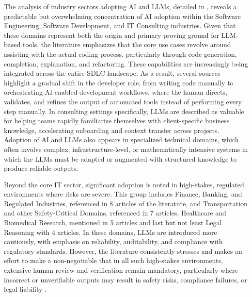 The analysis of industry sectors adopting AI and LLMs, detailed in , reveals a predictable but overwhelming concentration of AI adoption within the Software Engineering, Software Development, and IT Consulting industries. Given that these domains represent both the origin and primary proving ground for LLM-based tools, the literature emphasizes that the core use cases revolve around assisting with the actual coding process, particularly through code generation, completion, explanation, and refactoring. These capabilities are increasingly being integrated across the entire SDLC landscape. As a result, several sources highlight a gradual shift in the developer role, from writing code manually to orchestrating AI-enabled development workflows, where the human directs, validates, and refines the output of automated tools instead of performing every step manually. In consulting settings specifically, LLMs are described as valuable for helping teams rapidly familiarize themselves with client-specific business knowledge, accelerating onboarding and context transfer across projects. \cite{Jensen:2025me, Zhang:2025ea, Kim:2025ao} Adoption of AI and LLMs also appears in specialized technical domains, which often involve complex, infrastructure-level, or mathematically intensive systems in which the LLMs must be adapted or augmented with structured knowledge to produce reliable outputs. \cite{Wang:2025rs, Hou:2025cl, Ahmed:2025ai, Kim:2025ao, AlHashimi:2025er}

Beyond the core IT sector, significant adoption is noted in high-stakes, regulated environments where risks are severe. This group includes Finance, Banking, and Regulated Industries, referenced in 8 articles of the literature, and Transportation and other Safety-Critical Domains, referenced in 7 articles, Healthcare and Biomedical Research, mentioned in 5 articles and last but not least Legal Reasoning with 4 articles. In these domains, LLMs are introduced more cautiously, with emphasis on reliability, auditability, and compliance with regulatory standards.  However, the literature consistently stresses and makes an effort to make a non-negotiable that in all such high-stakes environments, extensive human review and verification remain mandatory, particularly where incorrect or unverifiable outputs may result in safety risks, compliance failures, or legal liability \cite{Moore:2025vc, Ahmed:2025ai, Jabrw:2025ss, Kim:2025ao, Qiu:2025ft}. 

